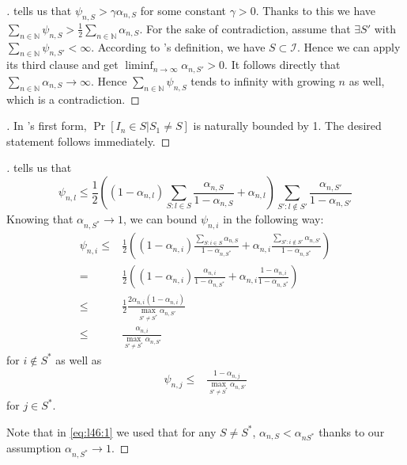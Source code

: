 \begin{proof}[]
   tells us that $\psi_{n, S} > \gamma
  \alpha_{n, S}$ for some constant $\gamma > 0$. Thanks to this we have $\sum_{n
  \in \mathbb{N}} \psi_{n, S} > \frac{1}{2} \sum_{n \in \mathbb{N}} \alpha_{n,
  S}$. For the sake of contradiction, assume that $\exists S'$ with $\sum_{n \in
  \mathbb{N}} \psi_{n, S'} < \infty$. According to
  's definition, we have $S \subset \mathcal{I}$.
  Hence we can apply its third clause and get $\liminf_{n \rightarrow \infty}
  \alpha_{n, S'} > 0$. It follows directly that $\sum_{n \in \mathbb{N}}
  \alpha_{n, S} \rightarrow \infty$. Hence $\sum_{n \in \mathbb{N}} \psi_{n, S}$
  tends to infinity with growing $n$ as well, which is a contradiction.
\end{proof}

\begin{proof}[]
  In 's first form,  $\Pr[I_n \in S | S_1
  \neq S]$ is naturally bounded by 1. The desired statement follows immediately.
\end{proof}

\begin{proof}[]
   tells us that
  \[\psi_{n, l} \leq \frac{1}{2}((1 - \alpha_{n, l}) \sum_{S: l \in S}
      \frac{\alpha_{n, S}}{1 - \alpha_{n, S}} + \alpha_{n, l})
      \sum_{S': l \notin S'} \frac{\alpha_{n, S'}}{1 - \alpha_{n, S'}}\]
  Knowing that $\alpha_{n, S^*} \rightarrow 1$, we can bound $\psi_{n, i}$ in
  the following way:
  \begin{align}
    \psi_{n, i} \leq& \frac{1}{2}((1 - \alpha_{n, i}) \frac{\sum_{S: i \in S}
        \alpha_{n, S}}{1 - \alpha_{n, S^*}} + \alpha_{n, i} \frac{\sum_{S': i
        \notin S'} \alpha_{n, S'}}{1 - \alpha_{n, S^*}}) \label{eq:l46:1}\\
      =& \frac{1}{2}((1 - \alpha_{n, i}) \frac{\alpha_{n, i}}{1 - \alpha_{n,
          S^*}} + \alpha_{n, i} \frac{1 - \alpha_{n, i}}{1 - \alpha_{n, S^*}})\\
      \leq& \frac{1}{2} \frac{2 \alpha_{n, i} (1 - \alpha_{n, i})}{\max_{S'
          \neq S^*} \alpha_{n, S'}} \\
      \leq& \frac{\alpha_{n, i}}{\max_{S' \neq S^*} \alpha_{n, S'}}
  \end{align}
  for $i \notin S^*$ as well as
  \begin{align}
    \psi_{n, j} \leq& \frac{1 - \alpha_{n, j}}{\max_{S' \neq S^*} \alpha_{n,
        S'}}
  \end{align}
  for $j \in S^*$.

  Note that in \eqref{eq:l46:1} we used that for any $S \neq S^*$, $\alpha_{n,
  S} < \alpha_{n S^*}$ thanks to our assumption $\alpha_{n, S^*} \rightarrow 1$.
\end{proof}

